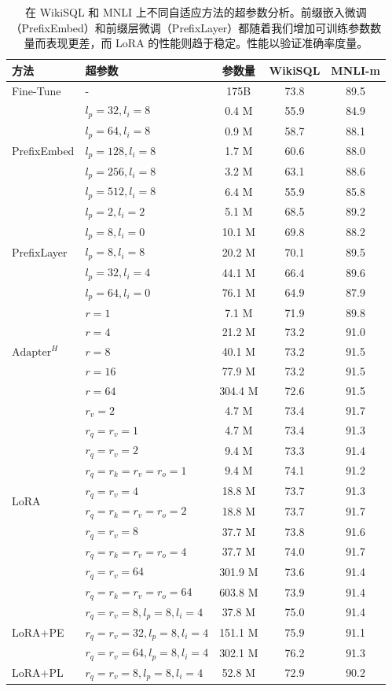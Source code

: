 \documentclass[11pt,UTF8,fontset=fandol]{ctexart}
\begin{document}
\begin{table}[H]\centering
\caption{在 WikiSQL 和 MNLI 上不同自适应方法的超参数分析。前缀嵌入微调（PrefixEmbed）和前缀层微调（PrefixLayer）都随着我们增加可训练参数数量而表现更差，而 LoRA 的性能则趋于稳定。性能以验证准确率度量。}
\label{tab:15}
\begin{tabular}{llccc}
\toprule
方法 & 超参数 & 参数量 & WikiSQL & MNLI-m \\
\midrule
Fine-Tune & - & 175B & 73.8 & 89.5 \\
\midrule
\multirow{5}{*}{PrefixEmbed}
 & $l_p=32, l_i=8$ & 0.4 M & 55.9 & 84.9 \\
 & $l_p=64, l_i=8$ & 0.9 M & 58.7 & 88.1 \\
 & $l_p=128, l_i=8$ & 1.7 M & 60.6 & 88.0 \\
 & $l_p=256, l_i=8$ & 3.2 M & 63.1 & 88.6 \\
 & $l_p=512, l_i=8$ & 6.4 M & 55.9 & 85.8 \\
\midrule
\multirow{5}{*}{PrefixLayer}
 & $l_p=2, l_i=2$ & 5.1 M & 68.5 & 89.2 \\
 & $l_p=8, l_i=0$ & 10.1 M & 69.8 & 88.2 \\
 & $l_p=8, l_i=8$ & 20.2 M & 70.1 & 89.5 \\
 & $l_p=32, l_i=4$ & 44.1 M & 66.4 & 89.6 \\
 & $l_p=64, l_i=0$ & 76.1 M & 64.9 & 87.9 \\
\midrule
\multirow{5}{*}{$\text{Adapter}^H$}
 & $r=1$ & 7.1 M & 71.9 & 89.8 \\
 & $r=4$ & 21.2 M & 73.2 & 91.0 \\
 & $r=8$ & 40.1 M & 73.2 & 91.5 \\
 & $r=16$ & 77.9 M & 73.2 & 91.5 \\
 & $r=64$ & 304.4 M & 72.6 & 91.5 \\
\midrule
\multirow{10}{*}{LoRA}
 & $r_v=2$ & 4.7 M & 73.4 & 91.7 \\
 & $r_q=r_v=1$ & 4.7 M & 73.4 & 91.3 \\
 & $r_q=r_v=2$ & 9.4 M & 73.3 & 91.4 \\
 & $r_q=r_k=r_v=r_o=1$ & 9.4 M & 74.1 & 91.2 \\
 & $r_q=r_v=4$ & 18.8 M & 73.7 & 91.3 \\
 & $r_q=r_k=r_v=r_o=2$ & 18.8 M & 73.7 & 91.7 \\
 & $r_q=r_v=8$ & 37.7 M & 73.8 & 91.6 \\
 & $r_q=r_k=r_v=r_o=4$ & 37.7 M & 74.0 & 91.7 \\
 & $r_q=r_v=64$ & 301.9 M & 73.6 & 91.4 \\
 & $r_q=r_k=r_v=r_o=64$ & 603.8 M & 73.9 & 91.4 \\
\midrule
\multirow{3}{*}{LoRA+PE}
 & $r_q=r_v=8, l_p=8, l_i=4$ & 37.8 M & 75.0 & 91.4 \\
 & $r_q=r_v=32, l_p=8, l_i=4$ & 151.1 M & 75.9 & 91.1 \\
 & $r_q=r_v=64, l_p=8, l_i=4$ & 302.1 M & 76.2 & 91.3 \\
\midrule
LoRA+PL & $r_q=r_v=8, l_p=8, l_i=4$ & 52.8 M & 72.9 & 90.2 \\
\bottomrule
\end{tabular}
\end{table}
\end{document}
